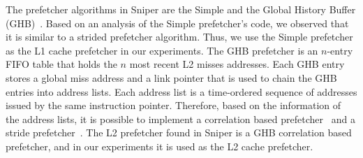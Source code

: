 \documentclass[AMA,final,STIX1COL]{WileyNJD-v2}
\begin{document}
The prefetcher algorithms in Sniper are the Simple and the Global History Buffer (GHB)~\cite{nesbit2004data}.
Based on an analysis of the Simple prefetcher's code, we observed that it is similar to a strided prefetcher algorithm.
Thus, we use the Simple prefetcher as the L1 cache prefetcher in our experiments.
The GHB prefetcher is an $n$-entry FIFO table that holds the $n$ most recent L2 misses addresses. 
Each GHB entry stores a global miss address and a link pointer that is used to chain the GHB entries into address lists. 
Each address list is a time-ordered sequence of addresses issued by the same instruction pointer.
Therefore, based on the information of the address lists, it is possible to implement a correlation based prefetcher~\cite{charney1995GeneralizedCB} and a stride prefetcher~\cite{nesbit2004data}.
The L2 prefetcher found in Sniper is a GHB correlation based prefetcher, and in our experiments it is used as the L2 cache prefetcher.


\begin{table}[!htb]
    \centering
    \footnotesize
    \caption{Prefetcher algorithms.}
    \label{prefetches}
\end{table}
\end{document}
